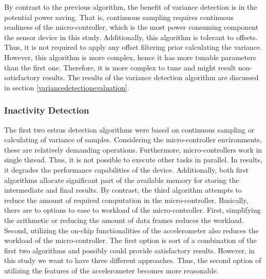 \documentclass[english,12pt,a4paper,pdftex,elec,utf8]{aaltothesis}
\begin{document}
By contrast to the previous algorithm, the benefit of variance detection is in the potential power saving. That is, continuous sampling requires continuous readiness of the micro-controller, which is the most power consuming component the sensor device in this study. Additionally, this algorithm is tolerant to offsets. Thus, it is not required to apply any offset filtering prior calculating the variance. However, this algorithm is more complex, hence it has more tunable parameters than the first one. Therefore, it is more complex to tune and might result non-satisfactory results. The results of the variance detection algorithm are discussed in section \ref{variancedetectionevaluation}. 

\subsubsection{Inactivity Detection} \label{inactivitydetectionsection}


The first two estrus detection algorithms were based on continuous sampling or calculating of variance of samples. Considering the micro-controller environments, these are relatively demanding operations. Furthermore, micro-controllers work in single thread. Thus, it is not possible to execute other tasks in parallel. In results, it degrades the performance capabilities of the device. Additionally, both first algorithms allocate significant part of the available memory for storing the intermediate and final results. By contrast, the third algorithm attempts to reduce the amount of required computation in the micro-controller. Basically, there are to options to ease to workload of the micro-controller. First, simplifying the arithmetic or reducing the amount of data frames reduces the workload. Second, utilizing the on-chip functionalities of the accelerometer also reduces the workload of the micro-controller. The first option is sort of a combination of the first two algorithms and possibly could provide satisfactory results. However, in this study we want to have three different approaches. Thus, the second option of utilizing the features of the accelerometer becomes more reasonable.
\end{document}
